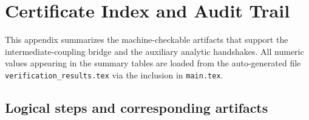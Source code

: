%

\section{Certificate Index and Audit Trail}
\label{sec:certificate-index}

This appendix summarizes the machine-checkable artifacts that support the intermediate-coupling bridge and the auxiliary analytic handshakes.
All numeric values appearing in the summary tables are loaded from the auto-generated file \texttt{verification\_results.tex} via the inclusion in \texttt{main.tex}.

\subsection{Logical steps and corresponding artifacts}

